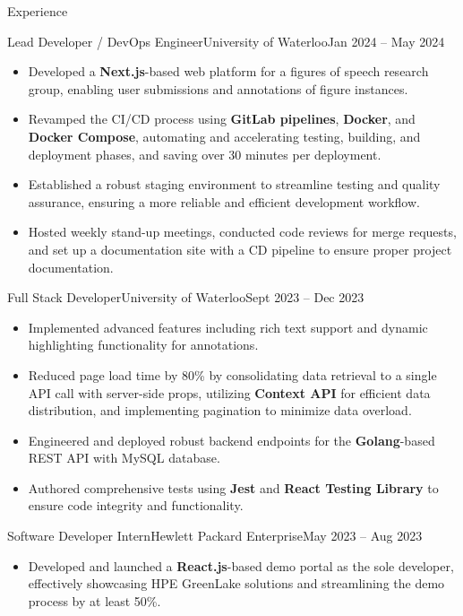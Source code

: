 \begin{cvsection}{Experience}
  \begin{cvsubsection}{Lead Developer / DevOps Engineer}{University of Waterloo}{Jan 2024 -- May 2024}	
    \begin{itemize}
      \item Developed a \textbf{Next.js}-based web platform for a figures of speech research group, enabling user submissions and annotations of figure instances.
      \item Revamped the CI/CD process using \textbf{GitLab pipelines}, \textbf{Docker}, and \textbf{Docker Compose}, automating and accelerating testing, building, and deployment phases, and saving over 30 minutes per deployment.
      \item Established a robust staging environment to streamline testing and quality assurance, ensuring a more reliable and efficient development workflow.
      \item Hosted weekly stand-up meetings, conducted code reviews for merge requests, and set up a documentation site with a CD pipeline to ensure proper project documentation.
    \end{itemize}	
  \end{cvsubsection}
  \begin{cvsubsection}{Full Stack Developer}{University of Waterloo}{Sept 2023 -- Dec 2023}
    \begin{itemize}
      \item Implemented advanced features including rich text support and dynamic highlighting functionality for annotations.
      \item Reduced page load time by 80\% by consolidating data retrieval to a single API call with server-side props, utilizing \textbf{Context API} for efficient data distribution, and implementing pagination to minimize data overload.
      \item Engineered and deployed robust backend endpoints for the \textbf{Golang}-based REST API with MySQL database.
      \item Authored comprehensive tests using \textbf{Jest} and \textbf{React Testing Library} to ensure code integrity and functionality.
    \end{itemize}
  \end{cvsubsection}
  \begin{cvsubsection}{Software Developer Intern}{Hewlett Packard Enterprise}{May 2023 -- Aug 2023}	
    \begin{itemize}
      \item Developed and launched a \textbf{React.js}-based demo portal as the sole developer, effectively showcasing HPE GreenLake solutions and streamlining the demo process by at least 50\%.

\end{itemize}
\end{cvsubsection}
\end{cvsection}
